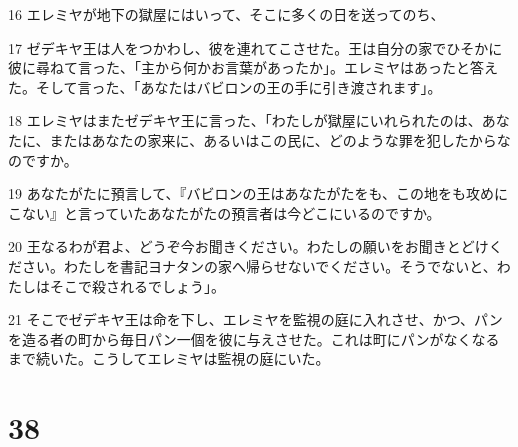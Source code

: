 \par 16 エレミヤが地下の獄屋にはいって、そこに多くの日を送ってのち、
\par 17 ゼデキヤ王は人をつかわし、彼を連れてこさせた。王は自分の家でひそかに彼に尋ねて言った、「主から何かお言葉があったか」。エレミヤはあったと答えた。そして言った、「あなたはバビロンの王の手に引き渡されます」。
\par 18 エレミヤはまたゼデキヤ王に言った、「わたしが獄屋にいれられたのは、あなたに、またはあなたの家来に、あるいはこの民に、どのような罪を犯したからなのですか。
\par 19 あなたがたに預言して、『バビロンの王はあなたがたをも、この地をも攻めにこない』と言っていたあなたがたの預言者は今どこにいるのですか。
\par 20 王なるわが君よ、どうぞ今お聞きください。わたしの願いをお聞きとどけください。わたしを書記ヨナタンの家へ帰らせないでください。そうでないと、わたしはそこで殺されるでしょう」。
\par 21 そこでゼデキヤ王は命を下し、エレミヤを監視の庭に入れさせ、かつ、パンを造る者の町から毎日パン一個を彼に与えさせた。これは町にパンがなくなるまで続いた。こうしてエレミヤは監視の庭にいた。

\chapter{38}


